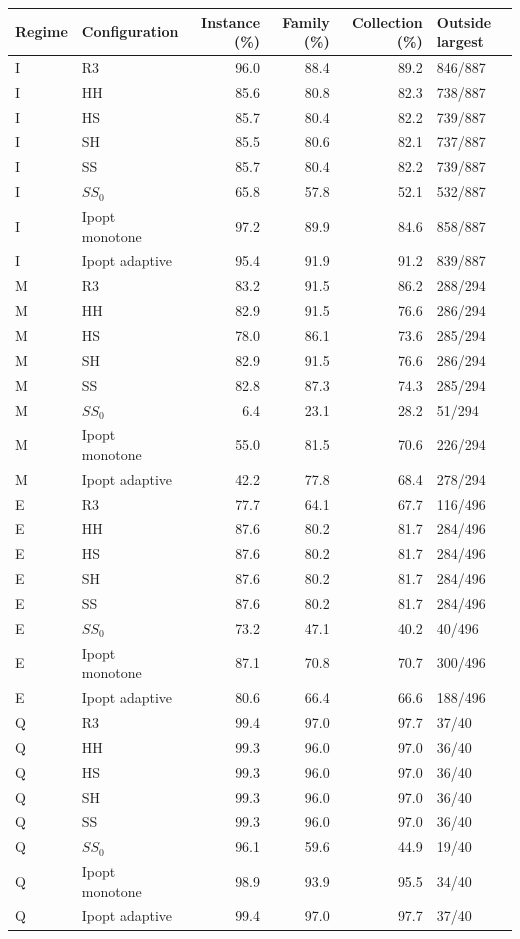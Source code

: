 \begin{tabular}{@{}llrrrl@{}}
\toprule
Regime & Configuration & Instance (\%) & Family (\%) & Collection (\%) & Outside largest\\
\midrule
I & R3 & 96.0 & 88.4 & 89.2 & 846/887\\
I & HH & 85.6 & 80.8 & 82.3 & 738/887\\
I & HS & 85.7 & 80.4 & 82.2 & 739/887\\
I & SH & 85.5 & 80.6 & 82.1 & 737/887\\
I & SS & 85.7 & 80.4 & 82.2 & 739/887\\
I & $SS_0$ & 65.8 & 57.8 & 52.1 & 532/887\\
I & Ipopt monotone & 97.2 & 89.9 & 84.6 & 858/887\\
I & Ipopt adaptive & 95.4 & 91.9 & 91.2 & 839/887\\
M & R3 & 83.2 & 91.5 & 86.2 & 288/294\\
M & HH & 82.9 & 91.5 & 76.6 & 286/294\\
M & HS & 78.0 & 86.1 & 73.6 & 285/294\\
M & SH & 82.9 & 91.5 & 76.6 & 286/294\\
M & SS & 82.8 & 87.3 & 74.3 & 285/294\\
M & $SS_0$ & 6.4 & 23.1 & 28.2 & 51/294\\
M & Ipopt monotone & 55.0 & 81.5 & 70.6 & 226/294\\
M & Ipopt adaptive & 42.2 & 77.8 & 68.4 & 278/294\\
E & R3 & 77.7 & 64.1 & 67.7 & 116/496\\
E & HH & 87.6 & 80.2 & 81.7 & 284/496\\
E & HS & 87.6 & 80.2 & 81.7 & 284/496\\
E & SH & 87.6 & 80.2 & 81.7 & 284/496\\
E & SS & 87.6 & 80.2 & 81.7 & 284/496\\
E & $SS_0$ & 73.2 & 47.1 & 40.2 & 40/496\\
E & Ipopt monotone & 87.1 & 70.8 & 70.7 & 300/496\\
E & Ipopt adaptive & 80.6 & 66.4 & 66.6 & 188/496\\
Q & R3 & 99.4 & 97.0 & 97.7 & 37/40\\
Q & HH & 99.3 & 96.0 & 97.0 & 36/40\\
Q & HS & 99.3 & 96.0 & 97.0 & 36/40\\
Q & SH & 99.3 & 96.0 & 97.0 & 36/40\\
Q & SS & 99.3 & 96.0 & 97.0 & 36/40\\
Q & $SS_0$ & 96.1 & 59.6 & 44.9 & 19/40\\
Q & Ipopt monotone & 98.9 & 93.9 & 95.5 & 34/40\\
Q & Ipopt adaptive & 99.4 & 97.0 & 97.7 & 37/40\\
\bottomrule
\end{tabular}

